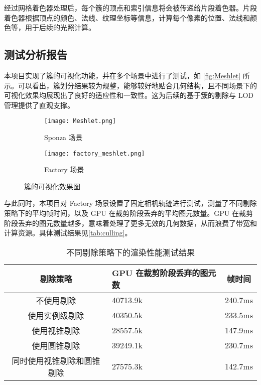 经过网格着色器处理后，每个簇的顶点和索引信息将会被传递给片段着色器。片段着色器根据顶点的颜色、法线、纹理坐标等信息，计算每个像素的位置、法线和颜色等，用于后续的光照计算。

\subsection{测试分析报告}

本项目实现了簇的可视化功能，并在多个场景中进行了测试，如 \autoref{fig:Meshlet} 所示。可以看出，簇划分结果较为规整，能够较好地贴合几何结构，且不同场景下的可视化效果均展现出了良好的适应性和一致性。这为后续的基于簇的剔除与 LOD 管理提供了直观支撑。


\begin{figure*}[htbp]
    \centering

    \begin{subfigure}[b]{0.48\linewidth}
        \centering
        \texttt{[image: Meshlet.png]}
        \caption{Sponza 场景}
    \end{subfigure}
    \hfill
    \begin{subfigure}[b]{0.48\linewidth}
        \centering
        \texttt{[image: factory\_meshlet.png]}
        \caption{Factory 场景}
    \end{subfigure}

    \caption{簇的可视化效果图}
    \vspace{-0.2cm}
    \label{fig:Meshlet}
\end{figure*}

与此同时，本项目对 Factory 场景设置了固定相机轨迹进行测试，测量了不同剔除策略下的平均帧时间，以及 GPU 在裁剪阶段丢弃的平均图元数量。GPU 在裁剪阶段丢弃的图元数量越多，意味着处理了更多无效的几何数据，从而浪费了带宽和计算资源。具体测试结果见\autoref{tab:culling}。

\begin{table}[H]
    \caption{\label{tab:culling}不同剔除策略下的渲染性能测试结果}
    \begin{tabularx}{\linewidth}{|c|X<{\centering}|c|}
        \hline
        剔除策略 & GPU 在裁剪阶段丢弃的图元数 & 帧时间 \\ \hline
        不使用剔除 & 40713.9k & 240.7ms \\ \hline
        使用实例级剔除 & 40350.5k & 233.5ms \\ \hline
        使用视锥剔除 & 28557.5k & 147.9ms \\ \hline
        使用圆锥剔除 & 39249.1k & 230.7ms \\ \hline
        同时使用视锥剔除和圆锥剔除 & 27575.3k & 142.7ms \\ \hline
    \end{tabularx}
\end{table}

